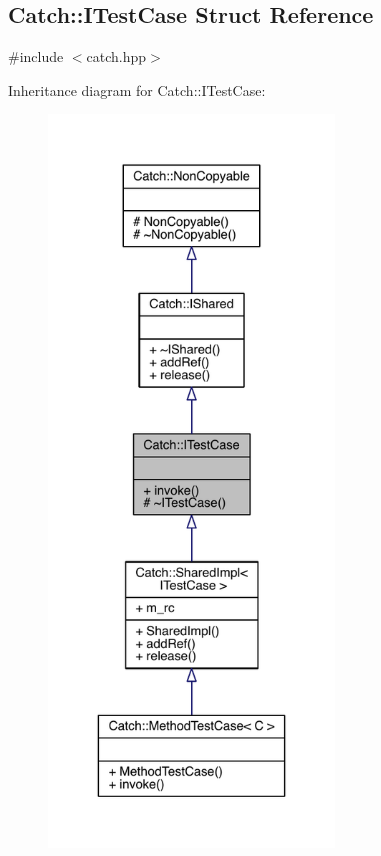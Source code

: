 \hypertarget{a00045}{}\subsection{Catch\+:\+:I\+Test\+Case Struct Reference}
\label{a00045}


{\ttfamily \#include $<$catch.\+hpp$>$}



Inheritance diagram for Catch\+:\+:I\+Test\+Case\+:\nopagebreak
\begin{figure}[H]
\begin{center}
\leavevmode
\includegraphics[height=550pt]{a00223}
\end{center}
\end{figure}


